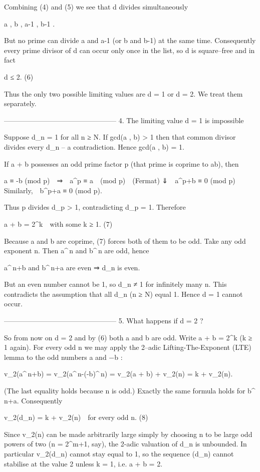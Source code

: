 Combining (4) and (5) we see that d divides simultaneously

a , b , a-1 , b-1 .

But no prime can divide a and a-1 (or b and b-1) at the same time.
Consequently every prime divisor of d can occur only once in the list,
so d is square–free and in fact

d ≤ 2.                                                              (6)

Thus the only two possible limiting values are d = 1 or d = 2.
We treat them separately.

------------------------------------------------
4.  The limiting value d = 1 is impossible

Suppose d_n = 1 for all n ≥ N.  
If gcd(a , b) > 1 then that common divisor divides every d_n – a
contradiction.  Hence gcd(a , b) = 1.

If a + b possesses an odd prime factor p (that prime is coprime to
ab), then

a ≡ -b (mod p) ⇒ a^{p} ≡ a (mod p) (Fermat)  
⇓ a^{p}+b ≡ 0 (mod p)  
Similarly, b^{p}+a ≡ 0 (mod p).

Thus p divides d_p > 1, contradicting d_p = 1.  Therefore

a + b = 2^{k} with some k ≥ 1.                                     (7)

Because a and b are coprime, (7) forces both of them to be odd.
Take any odd exponent n.  Then a^{\,n} and b^{\,n} are odd, hence

a^{\,n}+b and b^{\,n}+a are even  ⇒  d_n is even.

But an even number cannot be 1, so d_n ≠ 1 for infinitely many n.
This contradicts the assumption that all d_n (n ≥ N) equal 1.
Hence d = 1 cannot occur.

------------------------------------------------
5.  What happens if d = 2 ?

So from now on d = 2 and by (6) both a and b are odd.
Write a + b = 2^{k} (k ≥ 1 again).
For every odd n we may apply the 2–adic Lifting-The-Exponent (LTE) lemma
to the odd numbers a and −b :

v_2(a^{\,n}+b) = v_2(a^{\,n}-(-b)^{\,n})
               = v_2(a + b) + v_2(n) = k + v_2(n).

(The last equality holds because n is odd.)
Exactly the same formula holds for b^{\,n}+a.  Consequently

v_2(d_n) = k + v_2(n) for every odd n.                             (8)

Since v_2(n) can be made arbitrarily large simply by choosing n to be
large odd powers of two (n = 2^{m}+1, say), the 2-adic valuation of d_n
is unbounded.  In particular v_2(d_n) cannot stay equal to 1, so the
sequence (d_n) cannot stabilise at the value 2 unless k = 1, i.e.
a + b = 2.

